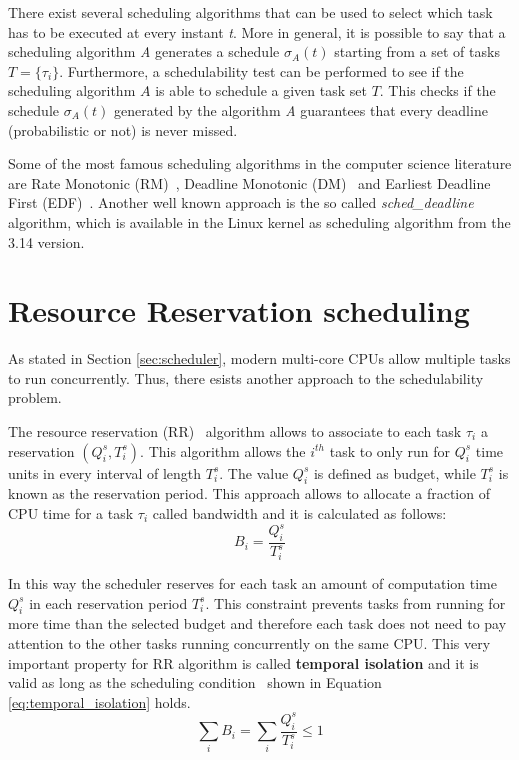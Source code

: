 There exist several scheduling algorithms that can be used to select which task 
has to be executed at every instant \emph{t}. More in general, it is
possible to say that a scheduling algorithm \emph{A} generates a schedule
\( \sigma_{A}\left(t\right) \) starting from a set of tasks \( T = \{\tau_{i}\} \).
Furthermore, a schedulability test can be performed to see if the scheduling
algorithm \( A \) is able to schedule a given task set \( T \). This checks
if the schedule \( \sigma_{A}\left(t\right) \) generated by the algorithm \emph{A}
guarantees that every deadline (probabilistic or not) is never missed.

Some of the most famous scheduling algorithms in the computer science literature
are Rate Monotonic (RM)~\cite{lehoczky1989rate}, Deadline Monotonic
(DM)~\cite{audsley1991hard} and Earliest Deadline First (EDF)~\cite{jansen2003lightweight}.
Another well known approach is the so called \emph{sched\_deadline}~\cite{lelli2016deadline}
algorithm, which is available in the Linux kernel as scheduling algorithm from
the 3.14 version.

\section{Resource Reservation scheduling}
As stated in Section \ref{sec:scheduler}, modern multi-core CPUs allow multiple
tasks to run concurrently. Thus, there esists another approach to the schedulability
problem.

The resource reservation (RR)~\cite{abeni1998integrating} algorithm allows to associate to each task 
\( \tau_{i} \) a reservation \( \left(Q_{i}^s, T_{i}^s\right) \). 
This algorithm allows the \( i^{th} \) task to only run for \( Q_{i}^s \) time units 
in every interval of length \( T_{i}^s \). The value \( Q_{i}^s \) is defined as
budget, while \( T_{i}^s \) is known as the reservation period.
This approach allows to allocate a fraction of CPU time for a task \( \tau_{i} \)
called bandwidth and it is calculated as follows:
\begin{equation}
    B_{i} = \frac{Q_{i}^s}{T_{i}^s}
\end{equation}

In this way the scheduler reserves for each task an amount of computation
time \( Q_{i}^s \) in each reservation period \( T_{i}^s \). This constraint
prevents tasks from running for more time than the selected budget and
therefore each task does not need to pay attention to the other tasks running
concurrently on the same CPU. This very important property for RR algorithm is called
\textbf{temporal isolation} and it is valid as long as the scheduling
condition~\cite{lee2007handbook} shown in Equation \ref{eq:temporal_isolation} 
holds.
\begin{equation} \label{eq:temporal_isolation}
    \displaystyle\sum_{i} B_{i} =  \displaystyle\sum_{i} \frac{Q_{i}^s}{T_{i}^s} \leq 1
\end{equation}

